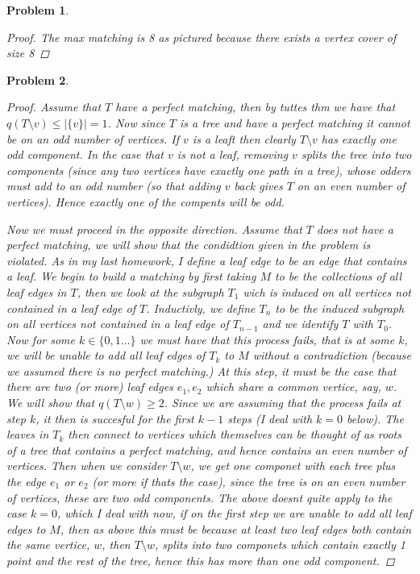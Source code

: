 \documentclass{article}
\newtheorem{prb}{Problem}
\begin{document}
\begin{prb} 
	\begin{proof} 
		The max matching is 8 as pictured because there exists a vertex cover of size 8 
	\end{proof}
\end{prb} 
\newpage
\begin{prb} 
	\begin{proof} 
	Assume that $T$ have a perfect matching, then by tuttes thm we have that $q(T \setminus v) \leq |\{v\}| = 1$. 
	Now since $T$ is a tree and have a perfect matching it cannot be on an odd number of vertices. If $v$ is a leaft 
	then clearly $T \setminus v$ has exactly one odd component. In the case that $v$ is not a leaf, removing $v$ splits the 
	tree into two components (since any two vertices have exactly one path in a tree), whose odders must add to an odd number 
	(so that adding $v$ back gives $T$ on an even number of vertices). Hence exactly one of the compents will be odd. 


	Now we must proceed in the opposite direction. Assume that $T$ does not have a perfect matching, we will show that the condidtion given in the problem is violated. As in my last homework, I define a leaf edge to be an edge that contains a leaf. We begin to build a matching by first taking $M$ to be the collections of all leaf edges in $T$, then we look at the subgraph $T_1$ wich is induced on all vertices not contained in a leaf edge of $T$. 
	Inductivly, we define $T_n$ to be the induced subgraph on all vertices not contained in a leaf edge of $T_{n-1}$ and we identify $T$ with $T_0$. 
	Now for some $k \in \{0, 1 \dots\}$ we must have that this process fails, that is at some $k$, we will be unable to add all leaf edges of $T_k$ to $M$ without a contradiction (because we assumed there is no perfect matching.) At this step, it must be the case that there are two (or more) leaf edges $e_1, e_2$ which 
	share a common vertice, say, $w$. We will show that $q(T \setminus w) \geq 2$. Since we are assuming that the process fails at step $k$, 
	it then is succesful for the first $k-1$ steps (I deal with $k=0$ below). The leaves in $T_k$ then connect to vertices which themselves can be thought of as roots of a tree that contains a perfect matching, and hence contains an even number of vertices. Then when we consider $T \setminus w$, 
we get one componet with each tree plus the edge $e_1$ or $e_2$ (or more if thats the case), since the tree is on an even number of vertices, these are two odd components. The above doesnt quite apply to the case $k =0$, which I deal with now, if on the first step we are unable to add all leaf edges to $M$, then as above this must be because at least two leaf edges both contain the same vertice, $w$, then $T\setminus w$, splits into two componets which contain exactly 1 point and the rest of the tree, hence this has more than one odd component. 
	\end{proof} 

\end{prb} 

\newpage
\end{document}
